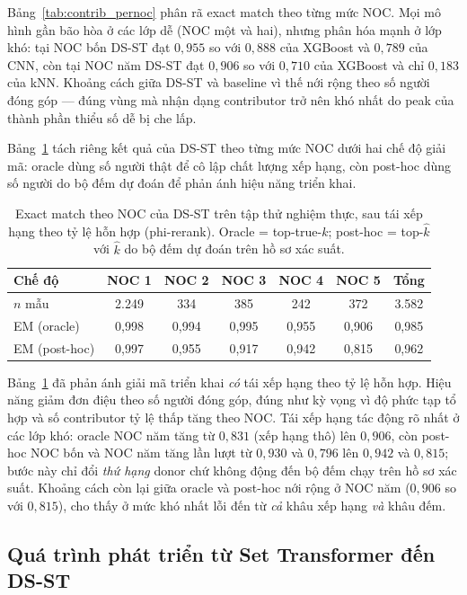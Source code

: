 \documentclass[12pt,a4paper]{article}
\begin{document}
Bảng~\ref{tab:contrib_pernoc} phân rã exact match theo từng mức NOC. Mọi mô hình gần bão hòa ở các lớp dễ (NOC một và hai), nhưng phân hóa mạnh ở lớp khó: tại NOC bốn DS-ST đạt \(0,955\) so với \(0,888\) của XGBoost và \(0,789\) của CNN, còn tại NOC năm DS-ST đạt \(0,906\) so với \(0,710\) của XGBoost và chỉ \(0,183\) của kNN. Khoảng cách giữa DS-ST và baseline vì thế nới rộng theo số người đóng góp — đúng vùng mà nhận dạng contributor trở nên khó nhất do peak của thành phần thiểu số dễ bị che lấp.

Bảng~\ref{tab:contrib} tách riêng kết quả của DS-ST theo từng mức NOC dưới hai chế độ giải mã: oracle dùng số người thật để cô lập chất lượng xếp hạng, còn post-hoc dùng số người do bộ đếm dự đoán để phản ánh hiệu năng triển khai.

\begin{table}[H]
\centering
\caption{Exact match theo NOC của DS-ST trên tập thử nghiệm thực, sau tái xếp hạng theo tỷ lệ hỗn hợp (phi-rerank). Oracle = top-true-\(k\); post-hoc = top-\(\hat{k}\) với \(\hat{k}\) do bộ đếm dự đoán trên hồ sơ xác suất.}
\label{tab:contrib}
\small
\begin{tabular}{lcccccc}
\toprule
\textbf{Chế độ} & \textbf{NOC 1} & \textbf{NOC 2} & \textbf{NOC 3} & \textbf{NOC 4} & \textbf{NOC 5} & \textbf{Tổng} \\
\midrule
\(n\) mẫu & 2.249 & 334 & 385 & 242 & 372 & 3.582 \\
EM (oracle)   & 0,998 & 0,994 & 0,995 & 0,955 & 0,906 & 0,985 \\
EM (post-hoc) & 0,997 & 0,955 & 0,917 & 0,942 & 0,815 & 0,962 \\
\bottomrule
\end{tabular}
\end{table}

Bảng~\ref{tab:contrib} đã phản ánh giải mã triển khai \emph{có} tái xếp hạng theo tỷ lệ hỗn hợp. Hiệu năng giảm đơn điệu theo số người đóng góp, đúng như kỳ vọng vì độ phức tạp tổ hợp và số contributor tỷ lệ thấp tăng theo NOC. Tái xếp hạng tác động rõ nhất ở các lớp khó: oracle NOC năm tăng từ \(0,831\) (xếp hạng thô) lên \(0,906\), còn post-hoc NOC bốn và NOC năm tăng lần lượt từ \(0,930\) và \(0,796\) lên \(0,942\) và \(0,815\); bước này chỉ đổi \emph{thứ hạng} donor chứ không động đến bộ đếm chạy trên hồ sơ xác suất. Khoảng cách còn lại giữa oracle và post-hoc nới rộng ở NOC năm (\(0,906\) so với \(0,815\)), cho thấy ở mức khó nhất lỗi đến từ \emph{cả} khâu xếp hạng \emph{và} khâu đếm.

\subsection{Quá trình phát triển từ Set Transformer đến DS-ST}
\end{document}
